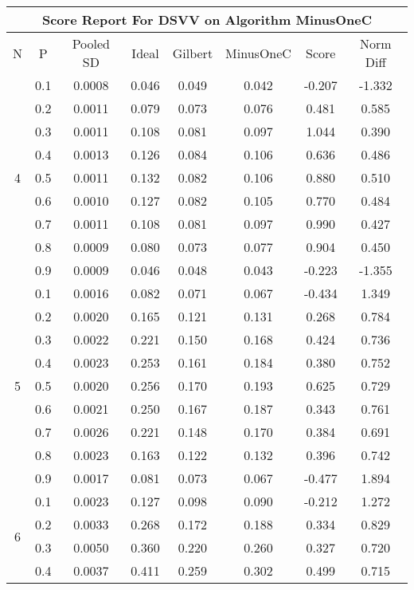 \documentclass[11pt,a4paper]{report}
\begin{document}
\begin{longtable}{ | c | c || c | c | c | c | c | c | }
\hline
\multicolumn{8}{|c|}{ Score Report For DSVV on Algorithm MinusOneC} \\
\hline
N & P & Pooled SD &  Ideal &  Gilbert & MinusOneC  & Score & Norm Diff \\
 \hline
 \hline
 \endhead
\multirow{9}{*}{4} & 0.1 & 0.0008 & 0.046 & 0.049 & 0.042 & -0.207 & -1.332 \\
 & 0.2 & 0.0011 & 0.079 & 0.073 & 0.076 & 0.481 & 0.585 \\
 & 0.3 & 0.0011 & 0.108 & 0.081 & 0.097 & 1.044 & 0.390 \\
 & 0.4 & 0.0013 & 0.126 & 0.084 & 0.106 & 0.636 & 0.486 \\
 & 0.5 & 0.0011 & 0.132 & 0.082 & 0.106 & 0.880 & 0.510 \\
 & 0.6 & 0.0010 & 0.127 & 0.082 & 0.105 & 0.770 & 0.484 \\
 & 0.7 & 0.0011 & 0.108 & 0.081 & 0.097 & 0.990 & 0.427 \\
 & 0.8 & 0.0009 & 0.080 & 0.073 & 0.077 & 0.904 & 0.450 \\
 & 0.9 & 0.0009 & 0.046 & 0.048 & 0.043 & -0.223 & -1.355 \\
 \hline
\multirow{9}{*}{5} & 0.1 & 0.0016 & 0.082 & 0.071 & 0.067 & -0.434 & 1.349 \\
 & 0.2 & 0.0020 & 0.165 & 0.121 & 0.131 & 0.268 & 0.784 \\
 & 0.3 & 0.0022 & 0.221 & 0.150 & 0.168 & 0.424 & 0.736 \\
 & 0.4 & 0.0023 & 0.253 & 0.161 & 0.184 & 0.380 & 0.752 \\
 & 0.5 & 0.0020 & 0.256 & 0.170 & 0.193 & 0.625 & 0.729 \\
 & 0.6 & 0.0021 & 0.250 & 0.167 & 0.187 & 0.343 & 0.761 \\
 & 0.7 & 0.0026 & 0.221 & 0.148 & 0.170 & 0.384 & 0.691 \\
 & 0.8 & 0.0023 & 0.163 & 0.122 & 0.132 & 0.396 & 0.742 \\
 & 0.9 & 0.0017 & 0.081 & 0.073 & 0.067 & -0.477 & 1.894 \\
 \hline
\multirow{9}{*}{6} & 0.1 & 0.0023 & 0.127 & 0.098 & 0.090 & -0.212 & 1.272 \\
 & 0.2 & 0.0033 & 0.268 & 0.172 & 0.188 & 0.334 & 0.829 \\
 & 0.3 & 0.0050 & 0.360 & 0.220 & 0.260 & 0.327 & 0.720 \\
 & 0.4 & 0.0037 & 0.411 & 0.259 & 0.302 & 0.499 & 0.715 \\

\end{longtable}
\end{document}
